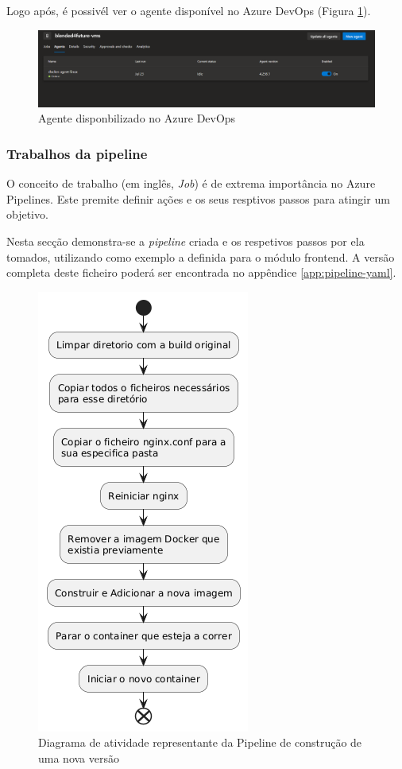 Logo após, é possivél ver o agente disponível no Azure DevOps (Figura \ref{fig:agent-devops}). 

\begin{figure}[h!tbp]
\includegraphics[width=\linewidth]{capitulos/cap4-implementacao/assets/devops-agent.png}
\caption{Agente disponbilizado no Azure DevOps}
\label{fig:agent-devops}
\end{figure}

\subsubsection{Trabalhos da pipeline}

O conceito de trabalho (em inglês, \textit{Job}) é de extrema importância no Azure Pipelines. Este premite definir ações e os seus resptivos passos para atingir um objetivo.

Nesta secção demonstra-se a \textit{pipeline} criada e os respetivos passos por ela tomados, utilizando como exemplo a definida para o módulo frontend. A versão completa deste ficheiro poderá ser encontrada no appêndice \ref{app:pipeline-yaml}. 

\begin{figure}[h!tbp]
    \centering
    \includegraphics[width=0.3\linewidth]{capitulos/cap4-implementacao/assets/pipeline-activity-diagram.png}
    \caption{Diagrama de atividade representante da Pipeline de construção de uma nova versão}
    \label{fig:pipeline-ad}
\end{figure}


